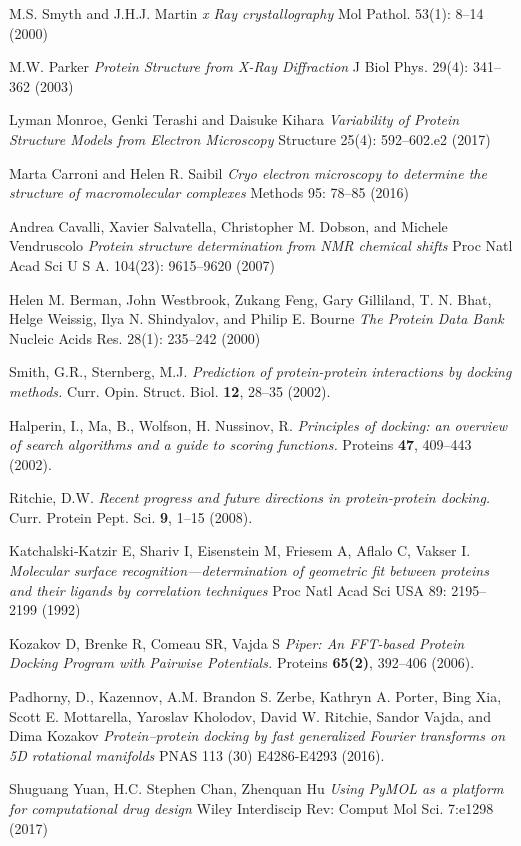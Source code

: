 \documentclass[a4paper,12pt]{article}
\numberwithin{equation}{section}%
\begin{document}
\begin{thebibliography}{99}

M.S. Smyth and J.H.J. Martin \textit{x Ray crystallography} Mol Pathol. 53(1): 8–14 (2000)

M.W. Parker \textit{Protein Structure from X-Ray Diffraction} J Biol Phys. 29(4): 341–362 (2003)

Lyman Monroe, Genki Terashi and Daisuke Kihara \textit{Variability of Protein Structure Models from Electron Microscopy} Structure 25(4): 592–602.e2 (2017)

Marta Carroni and Helen R. Saibil \textit{Cryo electron microscopy to determine the structure of macromolecular complexes} Methods 95: 78–85 (2016)

Andrea Cavalli, Xavier Salvatella, Christopher M. Dobson, and Michele Vendruscolo \textit{Protein structure determination from NMR chemical shifts} Proc Natl Acad Sci U S A. 104(23): 9615–9620 (2007)

Helen M. Berman, John Westbrook, Zukang Feng, Gary Gilliland, T. N. Bhat, Helge Weissig, Ilya N. Shindyalov, and Philip E. Bourne \textit{The Protein Data Bank} Nucleic Acids Res. 28(1): 235–242 (2000)

Smith, G.R., Sternberg, M.J. \textit{Prediction of protein-protein interactions by docking methods.} Curr. Opin. Struct. Biol. \textbf{12}, 28–35 (2002).

Halperin, I., Ma, B., Wolfson, H. Nussinov, R. \textit{Principles of docking: an overview of search algorithms and a guide to scoring functions.} Proteins \textbf{47}, 409–443 (2002).

Ritchie, D.W. \textit{Recent progress and future directions in protein-protein docking.} Curr. Protein Pept. Sci. \textbf{9}, 1–15 (2008).

Katchalski‐Katzir E, Shariv I, Eisenstein M, Friesem A, Aflalo C, Vakser I. \textit{Molecular surface recognition—determination of geometric fit between proteins and their ligands by correlation techniques} Proc Natl Acad Sci USA 89: 2195–2199  (1992)

Kozakov D, Brenke R, Comeau SR, Vajda S \textit{Piper: An FFT-based Protein Docking Program with Pairwise Potentials.} Proteins \textbf{65(2)}, 392–406 (2006).

Padhorny, D., Kazennov, A.M. Brandon S. Zerbe, Kathryn A. Porter, Bing Xia, Scott E. Mottarella, Yaroslav Kholodov, David W. Ritchie, Sandor Vajda, and Dima Kozakov \textit{Protein–protein docking by fast generalized Fourier transforms on 5D rotational manifolds} PNAS 113 (30) E4286-E4293 (2016).

Shuguang Yuan, H.C. Stephen Chan, Zhenquan Hu \textit{Using PyMOL as a platform for computational drug design} Wiley Interdiscip Rev: Comput Mol Sci. 7:e1298 (2017)


\end{thebibliography}
\end{document}
